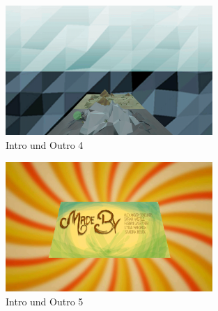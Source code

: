 \begin{figure}[!htbp]%
	\centering
		\includegraphics[width=0.7\textwidth]{images/Intro_4}
	\caption{Intro und Outro 4}
	\label{fig:Intro}
\end{figure}

\begin{figure}[!htbp]%
	\centering
		\includegraphics[width=0.7\textwidth]{images/Intro_5}
	\caption{Intro und Outro 5}
	\label{fig:Intro}
\end{figure}